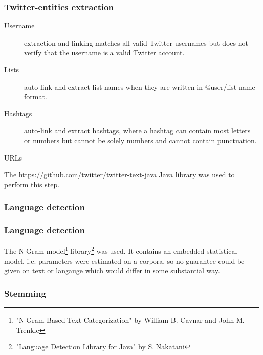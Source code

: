 \documentclass[handout]{beamer}
\begin{document}

\begin{frame}
\frametitle{\bf Twitter-entities extraction}

\begin{description}
\item[Username] extraction and linking matches all valid Twitter usernames but does not verify that the username is a valid Twitter account.
\item[Lists] auto-link and extract list names when they are written in @user/list-name format.
\item[Hashtags] auto-link and extract hashtags, where a hashtag can contain most letters or numbers but cannot be solely numbers and cannot contain punctuation.
\item[URLs]
\end{description}

The \url{https://github.com/twitter/twitter-text-java} Java library was used to perform this step.

\end{frame}


\subsubsection{Language detection}


\begin{frame}
\frametitle{\bf Language detection}

The N-Gram model\footnote{"N-Gram-Based Text Categorization" by William B. Cavnar and John M. Trenkle} library\footnote{"Language Detection Library for Java" by S. Nakatani} was used.
It contains an embedded statistical model, i.e. parameters were estimated on a corpora, so no guarantee could be given on text or langauge which would differ in some substantial way.

\end{frame}


\subsubsection{Stemming}
\end{document}
